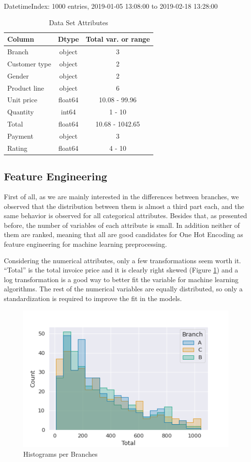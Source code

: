 \documentclass[11pt, a4]{article}
\begin{document}
DatetimeIndex: 1000 entries, 2019-01-05 13:08:00 to 2019-02-18 13:28:00
\begin{table}[h!]
\centering
\begin{tabular}{l c c}
\toprule
\textbf{Column} & \textbf{Dtype} & \textbf{Total var. or range} \\
\midrule
Branch & object & 3\\
Customer type & object & 2\\
Gender & object & 2\\
Product line & object & 6 \\ 
Unit price & float64 &10.08 - 99.96 \\
Quantity & int64  &1 - 10\\
Total & float64 &10.68 - 1042.65\\
Payment & object &3\\
Rating & float64 &4 - 10\\
\bottomrule
\end{tabular}
\caption{Data Set Attributes}
\label{table:1}
\end{table}


\subsection*{Feature Engineering}

First of all, as we are mainly interested in the differences between branches, we observed that the distribution between them is almost a third part each, and the same behavior is observed for all categorical attributes. Besides that, as presented before, the number of variables of each attribute is small. In addition neither of them are ranked, meaning that all are good candidates for One Hot Encoding as feature engineering for machine learning preprocessing.

Considering the numerical attributes, only a few transformations seem worth it. “Total” is the total invoice price and it is clearly right skewed (Figure \ref{fig:hist}) and a log transformation is a good way to better fit the variable for machine learning algorithms. The rest of the numerical variables are equally distributed, so only a standardization is required to improve the fit in the models. 

\begin{figure}[!h]
\includegraphics[]{hist}
\centering
\caption{Histograms per Branches}
\label{fig:hist}
\end{figure}
\end{document}
